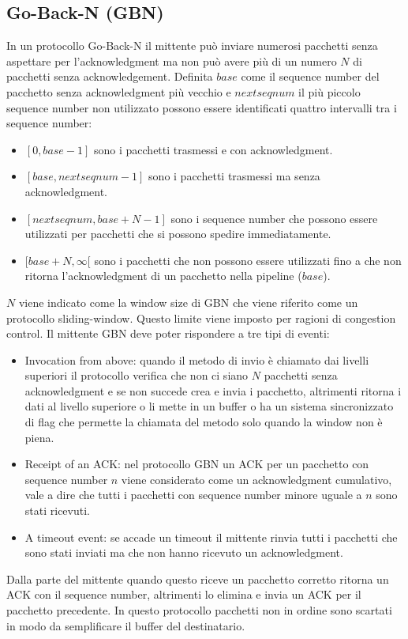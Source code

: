 \subsection{Go-Back-N (GBN)}
In un protocollo Go-Back-N il mittente pu\`o inviare numerosi pacchetti senza aspettare per l'acknowledgment ma non pu\`o avere pi\`u di un numero $N$ di 
pacchetti senza acknowledgement. Definita $base$ come il sequence number del pacchetto senza acknowledgment pi\`u vecchio e $nextseqnum$ il pi\`u piccolo
sequence number non utilizzato possono essere identificati quattro intervalli tra i sequence number:
\begin{itemize}
\item $[0, base-1]$ sono i pacchetti trasmessi e con acknowledgment.
\item $[base, nextseqnum-1]$ sono i pacchetti trasmessi ma senza acknowledgment.
\item $[nextseqnum, base+N-1]$ sono i sequence number che possono essere utilizzati per pacchetti che si possono spedire immediatamente.
\item $[base+N, \infty[$ sono i pacchetti che non possono essere utilizzati fino a che non ritorna l'acknowledgment di un pacchetto nella pipeline ($base$).
\end{itemize}
$N$ viene indicato come la window size di GBN che viene riferito come un protocollo sliding-window. Questo limite viene imposto per ragioni di congestion
control. Il mittente GBN deve poter rispondere a tre tipi di eventi:
\begin{itemize}
\item Invocation from above: quando il metodo di invio \`e chiamato dai livelli superiori il protocollo verifica che non ci siano $N$ pacchetti senza 
acknowledgment e se non succede crea e invia i pacchetto, altrimenti ritorna i dati al livello superiore o li mette in un buffer o ha un sistema 
sincronizzato di flag che permette la chiamata del metodo solo quando la window non \`e piena.
\item Receipt of an ACK: nel protocollo GBN un ACK per un pacchetto con sequence number $n$ viene considerato come un acknowledgment cumulativo, vale a dire
che tutti i pacchetti con sequence number minore uguale a $n$ sono stati ricevuti.
\item A timeout event: se accade un timeout il mittente rinvia tutti i pacchetti che sono stati inviati ma che non hanno ricevuto un acknowledgment.
\end{itemize}
Dalla parte del mittente quando questo riceve un pacchetto corretto ritorna un ACK con il sequence number, altrimenti lo elimina e invia un ACK per il
pacchetto precedente. In questo protocollo pacchetti non in ordine sono scartati in modo da semplificare il buffer del destinatario.
